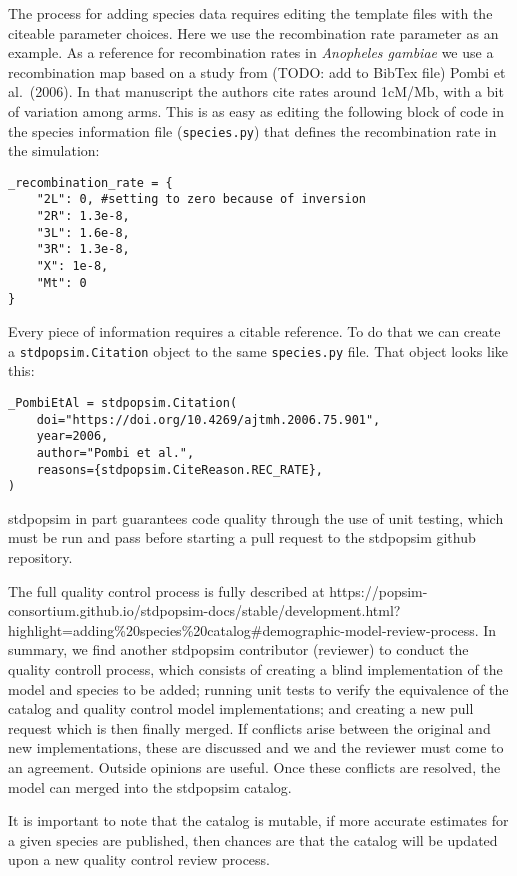 \documentclass[hidelinks]{article}
\begin{document}
The process for adding species data requires editing the template files
with the citeable parameter choices. Here we use the recombination rate
parameter as an example. As a reference for recombination rates in
\emph{Anopheles gambiae} we use a recombination map based on a study
from (TODO: add to BibTex file) Pombi et al.~(2006). In that manuscript
the authors cite rates around 1cM/Mb, with a bit of variation among
arms. This is as easy as editing the following block of code in the
species information file (\texttt{species.py}) that defines the
recombination rate in the simulation:

\begin{verbatim}
_recombination_rate = {
    "2L": 0, #setting to zero because of inversion 
    "2R": 1.3e-8, 
    "3L": 1.6e-8, 
    "3R": 1.3e-8, 
    "X": 1e-8,
    "Mt": 0
}
\end{verbatim}

Every piece of information requires a citable reference. To do that we
can create a \texttt{stdpopsim.Citation} object to the same
\texttt{species.py} file. That object looks like this:

\begin{verbatim}
_PombiEtAl = stdpopsim.Citation(
    doi="https://doi.org/10.4269/ajtmh.2006.75.901",
    year=2006,
    author="Pombi et al.",
    reasons={stdpopsim.CiteReason.REC_RATE},
)
\end{verbatim}

stdpopsim in part guarantees code quality through the use of unit
testing, which must be run and pass before starting a pull request to
the stdpopsim github repository.

The full quality control process is fully described at
https://popsim-consortium.github.io/stdpopsim-docs/stable/development.html?highlight=adding\%20species\%20catalog\#demographic-model-review-process.
In summary, we find another stdpopsim contributor (reviewer) to conduct
the quality controll process, which consists of creating a blind
implementation of the model and species to be added; running unit tests
to verify the equivalence of the catalog and quality control model
implementations; and creating a new pull request which is then finally
merged. If conflicts arise between the original and new implementations,
these are discussed and we and the reviewer must come to an agreement.
Outside opinions are useful. Once these conflicts are resolved, the
model can merged into the stdpopsim catalog.

It is important to note that the catalog is mutable, if more accurate
estimates for a given species are published, then chances are that the
catalog will be updated upon a new quality control review process.
\end{document}
